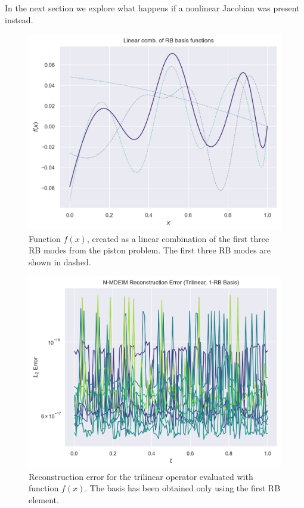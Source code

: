 \documentclass[../../thesis.tex]{subfiles}
\begin{document}
In the next section we explore what happens if a nonlinear Jacobian was present instead.
\begin{figure}[h]
    \includegraphics[width=\columnwidth]{research_project/piston/figures/svd_fourier/linear_combination.png}
    \caption{Function $f(x)$, created as a linear combination of the first three RB modes 
    from the piston problem.
    The first three RB modes are shown in dashed.}
    \label{fig:appendix_rb_linear_combination}
\end{figure}
\begin{figure}[h]
    \includegraphics[width=\columnwidth]{research_project/piston/figures/svd_fourier/trilinear_nonlinear/rb_basis_mdeim_errors_trilinear_num_1.png}
    \caption{Reconstruction error for the trilinear operator evaluated with function $f(x)$.
    The basis has been obtained only using the first RB element.}
    \label{fig:appendix_rb_trilinear_num_1}
\end{figure}
\end{document}

